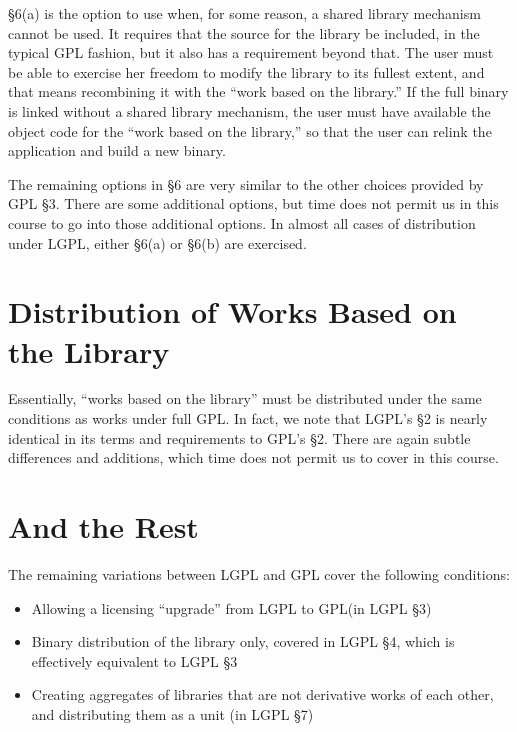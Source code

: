 \documentclass[11pt, letterpaper]{book}
\begin{document}
\S 6(a) is the option to use when, for some reason, a shared library
mechanism cannot be used. It requires that the source for the library be
included, in the typical GPL fashion, but it also has a requirement beyond
that. The user must be able to exercise her freedom to modify the library
to its fullest extent, and that means recombining it with the ``work based
on the library.''  If the full binary is linked without a shared library
mechanism, the user must have available the object code for the ``work
based on the library,'' so that the user can relink the application and
build a new binary.

The remaining options in \S 6 are very similar to the other choices
provided by GPL \S 3. There are some additional options, but time does
not permit us in this course to go into those additional options. In
almost all cases of distribution under LGPL, either \S 6(a) or \S 6(b) are
exercised.

\section{Distribution of Works Based on the Library}

Essentially, ``works based on the library'' must be distributed under the
same conditions as works under full GPL\@. In fact, we note that LGPL's
\S 2 is nearly identical in its terms and requirements to GPL's \S 2.
There are again subtle differences and additions, which time does not
permit us to cover in this course.

\section{And the Rest}

The remaining variations between LGPL and GPL cover the following
conditions:

\begin{itemize}

\item Allowing a licensing ``upgrade'' from LGPL to GPL\@ (in LGPL \S 3)

\item Binary distribution of the library only, covered in LGPL \S 4,
  which is effectively equivalent to LGPL \S 3

\item Creating aggregates of libraries that are not derivative works of
  each other, and distributing them as a unit (in LGPL \S 7)

\end{itemize}
\end{document}
